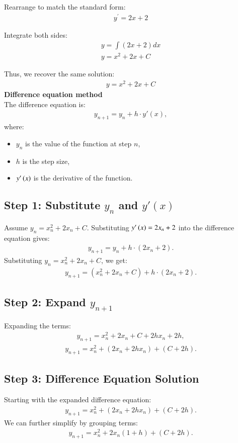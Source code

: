 \documentclass[journal]{IEEEtran}
\begin{document}
Rearrange to match the standard form:
\begin{align}
    y^\prime = 2x + 2
\end{align}

Integrate both sides:
\begin{align}
    y = \int (2x + 2) dx \\
    y = x^2 + 2x + C
\end{align}

Thus, we recover the same solution:
\begin{align}
    y = x^2 + 2x + C
\end{align}
 \textbf{ Difference equation method }\\
The difference equation is:
\begin{align}
y_{n+1} = y_n + h \cdot y'(x),
\end{align}
where:
\begin{itemize}
    \item  $y_n$ is the value of the function at step  $n$,
    \item $h$ is the step size,
    \item $y'\left(x\right)$ is the derivative of the function.
\end{itemize}
\subsection*{Step 1: Substitute $y_n$ and $y'(x)$}
Assume $y_n = x_n^2 + 2x_n + C$. Substituting  $y'\left(x\right) = 2x_n + 2$ into the difference equation gives:
\begin{align}
y_{n+1} = y_n + h \cdot (2x_n + 2).
\end{align}
Substituting  $y_n = x_n^2 + 2x_n + C $, we get:
\begin{align}
y_{n+1} = (x_n^2 + 2x_n + C) + h \cdot (2x_n + 2).
\end{align}

\subsection*{Step 2: Expand  $y_{n+1}$}
Expanding the terms:
\begin{align}
y_{n+1} = x_n^2 + 2x_n + C + 2hx_n + 2h,
\end{align}
\begin{align}
y_{n+1} = x_n^2 + (2x_n + 2hx_n) + (C + 2h).
\end{align}
\subsection*{Step 3: Difference Equation Solution}
Starting with the expanded difference equation:
\begin{align}
y_{n+1} = x_n^2 + (2x_n + 2hx_n) + (C + 2h).
\end{align}
We can further simplify by grouping terms:
\begin{align}
y_{n+1} = x_n^2 + 2x_n(1 + h) + (C + 2h).
\end{align}
\end{document}
